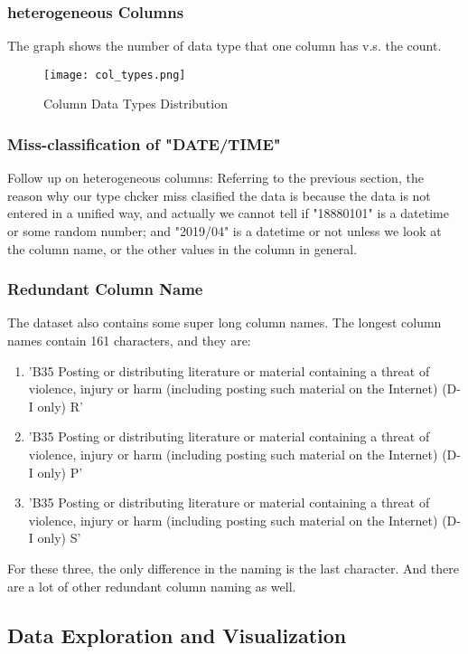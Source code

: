 \documentclass[sigconf]{acmart}
\begin{document}
\subsubsection{heterogeneous Columns} The graph shows the number of data type that one column has v.s. the count.
\begin{figure}[htp]
    \centering
    \texttt{[image: col\_types.png]}
    \caption{Column Data Types Distribution}
    \label{fig:galaxy}
\end{figure}
\subsubsection{Miss-classification of "DATE/TIME"} Follow up on heterogeneous columns: Referring to the previous section, the reason why our type chcker miss clasified the data is because the data is not entered in a unified way, and actually we cannot tell if "18880101" is a datetime or some random number; and "2019/04" is a datetime or not unless we look at the column name, or the other values in the column in general.
\subsubsection{Redundant Column Name} The dataset also contains some super long column names. The longest column names contain 161 characters, and they are:
\begin{enumerate}
    \item 'B35 Posting or distributing literature or material containing a threat of violence, injury or harm (including posting such material on the Internet) (D-I only) R'
    \item 'B35 Posting or distributing literature or material containing a threat of violence, injury or harm (including posting such material on the Internet) (D-I only) P'
    \item 'B35 Posting or distributing literature or material containing a threat of violence, injury or harm (including posting such material on the Internet) (D-I only) S'
\end{enumerate}
For these three, the only difference in the naming is the last character. And there are a lot of other redundant column naming as well.
\subsection{Data Exploration and Visualization}
\end{document}
